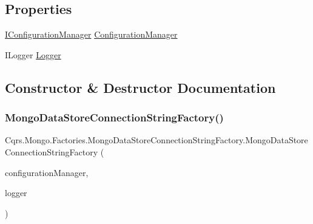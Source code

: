 \subsection*{Properties}
\begin{DoxyCompactItemize}
\item 
\hyperlink{interfaceCqrs_1_1Configuration_1_1IConfigurationManager}{I\+Configuration\+Manager} \hyperlink{classCqrs_1_1Mongo_1_1Factories_1_1MongoDataStoreConnectionStringFactory_a8bedb4433addd1adc1a20ee38893686d}{Configuration\+Manager}
\item 
I\+Logger \hyperlink{classCqrs_1_1Mongo_1_1Factories_1_1MongoDataStoreConnectionStringFactory_acc607022a5ff77a44aa7987cab70672a}{Logger}
\end{DoxyCompactItemize}


\subsection{Constructor \& Destructor Documentation}
\mbox{\label{classCqrs_1_1Mongo_1_1Factories_1_1MongoDataStoreConnectionStringFactory_acad4a48959c7d40b5934663d1b71f414}} 
\subsubsection{\texorpdfstring{Mongo\+Data\+Store\+Connection\+String\+Factory()}{MongoDataStoreConnectionStringFactory()}}
{\footnotesize\ttfamily Cqrs.\+Mongo.\+Factories.\+Mongo\+Data\+Store\+Connection\+String\+Factory.\+Mongo\+Data\+Store\+Connection\+String\+Factory (\begin{DoxyParamCaption}\item[{\hyperlink{interfaceCqrs_1_1Configuration_1_1IConfigurationManager}{I\+Configuration\+Manager}}]{configuration\+Manager,  }\item[{I\+Logger}]{logger }\end{DoxyParamCaption})}



